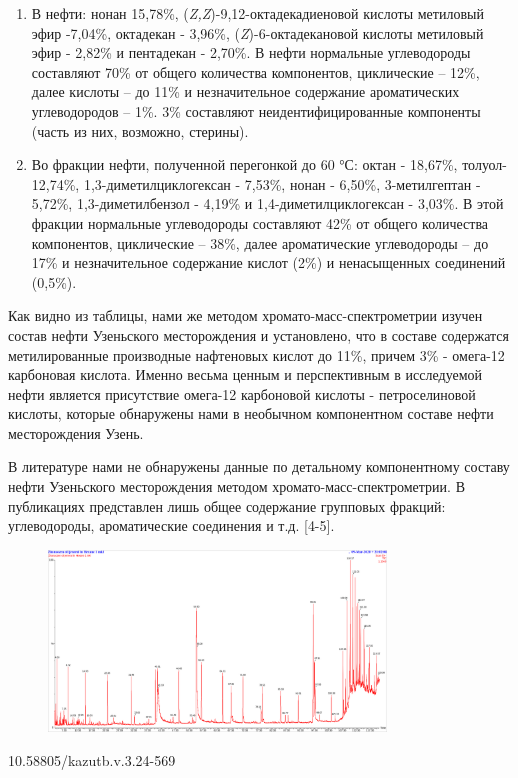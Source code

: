 \begin{enumerate}
\def\labelenumi{\arabic{enumi}.}
\item
  В нефти: нонан 15,78\%, (\emph{Z,Z})-9,12-октадекадиеновой кислоты
  метиловый эфир -7,04\%, октадекан - 3,96\%, (\emph{Z})-6-октадекановой
  кислоты метиловый эфир - 2,82\% и пентадекан - 2,70\%. В нефти
  нормальные углеводороды составляют 70\% от общего количества
  компонентов, циклические -- 12\%, далее кислоты -- до 11\% и
  незначительное содержание ароматических углеводородов -- 1\%. 3\%
  составляют неидентифицированные компоненты (часть из них, возможно,
  стерины).
\item
  Во фракции нефти, полученной перегонкой до 60 °С: октан - 18,67\%,
  толуол- 12,74\%, 1,3-диметилциклогексан - 7,53\%, нонан - 6,50\%,
  3-метилгептан - 5,72\%, 1,3-диметилбензол - 4,19\% и
  1,4-диметилциклогексан - 3,03\%. В этой фракции нормальные
  углеводороды составляют 42\% от общего количества компонентов,
  циклические -- 38\%, далее ароматические углеводороды -- до 17\% и
  незначительное содержание кислот (2\%) и ненасыщенных соединений
  (0,5\%).
\end{enumerate}

Как видно из таблицы, нами же методом хромато-масс-спектрометрии изучен
состав нефти Узеньского месторождения и установлено, что в составе
содержатся метилированные производные нафтеновых кислот до 11\%, причем
3\% - омега-12 карбоновая кислота. Именно весьма ценным и перспективным
в исследуемой нефти является присутствие омега-12 карбоновой кислоты -
петроселиновой кислоты, которые обнаружены нами в необычном компонентном
составе нефти месторождения Узень.

В литературе нами не обнаружены данные по детальному компонентному
составу нефти Узеньского месторождения методом
хромато-масс-спектрометрии. В публикациях представлен лишь общее
содержание групповых фракций: углеводороды, ароматические соединения и
т.д. {[}4-5{]}.

\begin{figure}[H]
	\centering
	\includegraphics[width=0.8\textwidth]{assets/370}
	\caption*{}
\end{figure}10.58805/kazutb.v.3.24-569

